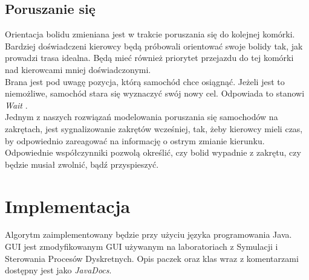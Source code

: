 \documentclass[12p]{extarticle}
\begin{document}
\subsection{Poruszanie się}
Orientacja bolidu zmieniana jest w trakcie poruszania się do kolejnej komórki. Bardziej doświadczeni kierowcy będą próbowali orientować swoje bolidy tak, jak prowadzi trasa idealna. Będą mieć również priorytet przejazdu do tej komórki nad kierowcami mniej doświadczonymi. \\

Brana jest pod uwagę pozycja, którą samochód chce osiągnąć. Jeżeli jest to niemożliwe, samochód stara się wyznaczyć swój nowy cel. Odpowiada to stanowi \textit{Wait} \cite{was}. \\

Jednym z naszych rozwiązań modelowania poruszania się samochodów na zakrętach, jest sygnalizowanie zakrętów wcześniej, tak, żeby kierowcy mieli czas, by odpowiednio zareagować na informację o ostrym zmianie kierunku. Odpowiednie współczynniki pozwolą określić, czy bolid wypadnie z zakrętu, czy będzie musiał zwolnić, bądź przyspieszyć.

\section{Implementacja}
Algorytm zaimplementowany będzie przy użyciu języka programowania Java. GUI jest zmodyfikowanym GUI używanym na laboratoriach z Symulacji i Sterowania Procesów Dyskretnych. Opis paczek oraz klas wraz z komentarzami dostępny jest jako \textit{JavaDocs}.
	


\end{document}
